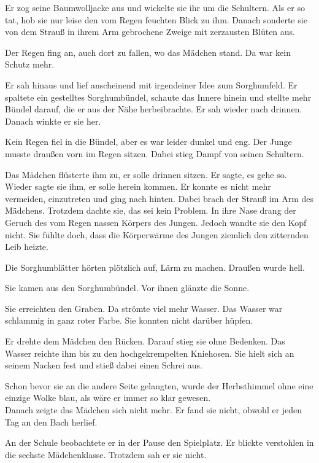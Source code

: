 \documentclass[prd,12pt,tightenlines,notitlepage,nofootinbib]{revtex4-1}
\begin{document}
Er zog seine Baumwolljacke
aus und wickelte sie ihr um die Schultern.  Als er so tat, hob sie nur
leise den vom Regen feuchten Blick zu ihm.  Danach sonderte sie von dem
Strauß in ihrem Arm gebrochene Zweige mit zerzausten Blüten aus.

Der Regen fing an, auch dort zu fallen, wo das Mädchen stand.
Da war kein Schutz mehr.

Er sah hinaus und lief anscheinend mit irgendeiner Idee zum
Sorghumfeld.  Er spaltete ein gestelltes Sorghumbündel,
schaute das Innere hinein und stellte mehr
Bündel darauf, die er aus der Nähe herbeibrachte.  Er sah wieder nach drinnen.
Danach winkte er sie her.

Kein Regen fiel in die Bündel, aber es war
leider dunkel und eng.  Der Junge musste draußen vorn im Regen
sitzen.  Dabei stieg Dampf von seinen Schultern.

Das Mädchen
flüsterte ihm zu, er solle drinnen sitzen.  Er sagte, es gehe so.  Wieder
sagte sie ihm, er solle herein kommen.  Er konnte es nicht mehr vermeiden,
einzutreten und ging nach hinten.
Dabei brach der Strauß im Arm des
Mädchens.  Trotzdem dachte sie, das sei kein Problem.  In ihre Nase drang
der Geruch des vom Regen nassen Körpers des Jungen.  Jedoch wandte
sie den Kopf nicht.  Sie fühlte doch, dass die Körperwärme des Jungen
ziemlich den zitternden Leib heizte.

Die Sorghumblätter hörten
plötzlich auf, Lärm zu machen.  Draußen wurde hell.

Sie kamen aus
den Sorghumbündel.  Vor ihnen glänzte die Sonne.

Sie
erreichten den Graben.  Da strömte viel mehr Wasser.  Das Wasser war
schlammig in ganz roter Farbe.  Sie konnten nicht darüber hüpfen.

Er
drehte dem Mädchen den Rücken.  Darauf stieg sie ohne Bedenken.  Das
Wasser reichte ihm bis zu den hochgekrempelten Kniehosen.  Sie hielt
sich an seinem Nacken fest und stieß dabei einen Schrei aus.

Schon
bevor sie an die andere Seite gelangten, wurde der Herbsthimmel ohne
eine einzige Wolke blau, als wäre er immer so klar gewesen.
\\

Danach zeigte das Mädchen sich nicht mehr.
Er fand sie nicht, obwohl er jeden Tag an den Bach herlief.

An der Schule beobachtete er in der Pause den Spielplatz.
Er blickte verstohlen in die sechste Mädchenklasse.
Trotzdem sah er sie nicht.
\end{document}
